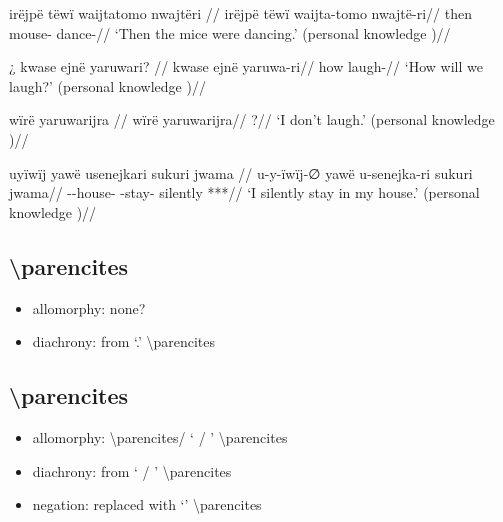 \documentclass{memoir}
\begin{document}
\ex \label{ctorat-16}
\begingl \glpreamble irëjpë tëwï waijtatomo nwajtëri //
\gla irëjpë tëwï waijta-tomo nwajtë-ri//
\glb then  mouse- dance-//
\glft ‘Then the mice were dancing.’ (personal knowledge
)//
\endgl
\xe

\ex \label{convrisamaj-6}
\begingl \glpreamble ¿ kwase ejnë yaruwari? //
\gla kwase ejnë yaruwa-ri//
\glb how  laugh-//
\glft ‘How will we laugh?’ (personal knowledge
)//
\endgl
\xe

\pex\label{gnomicri}    
\a \label{convrisamaj-4}
\begingl \glpreamble wïrë yaruwarijra //
\gla wïrë yaruwarijra//
\glb {} ?//
\glft ‘I don’t laugh.’ (personal knowledge
)//
\endgl

    
\a \label{convrisamaj-28}
\begingl \glpreamble uyïwïj yawë usenejkari sukuri jwama //
\gla u-y-ïwïj-∅ yawë u-senejka-ri sukuri jwama//
\glb {}--house-  -stay- silently ***//
\glft ‘I silently stay in my house.’ (personal knowledge
)//
\endgl

\xe

\subsection{\texorpdfstring{
\textbackslash parencites}{ \textbackslash parencites}}

\begin{itemize}
\tightlist
\item
  allomorphy: none?
\item
  diachrony: from  `.'
  \textbackslash parencites
\end{itemize}

\subsection{\texorpdfstring{
\textbackslash parencites}{ \textbackslash parencites}}

\begin{itemize}
\tightlist
\item
  allomorphy:  \textbackslash parencites/ `
  / ' \textbackslash parencites
\item
  diachrony: from  ` / '
  \textbackslash parencites
\item
  negation: replaced with  `' \textbackslash parencites
\end{itemize}
\end{document}
